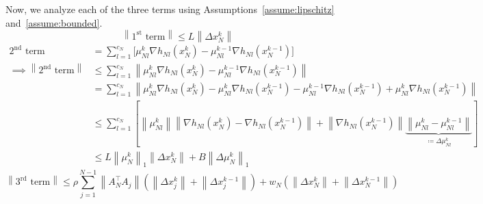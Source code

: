 \documentclass[11pt]{article}
\newcommand{\norm}[1]{\left\lVert #1 \right\rVert}
\begin{document}
Now, we analyze each of the three terms using Assumptions~\eqref{assume:lipschitz} and~\eqref{assume:bounded}.
\begin{equation*}
\norm{1^\text{st} \text{ term}} \leq L \norm{\Delta x_N^k}
\end{equation*}
\begin{align*}
2^\text{nd} \text{ term} &= \sum_{l = 1}^{c_N} \big[\mu_{Nl}^k\nabla h_{Nl}(x_N^k) - \mu_{Nl}^{k-1}\nabla h_{Nl}(x_N^{k-1}) \big] \\
\implies  \norm{2^\text{nd} \text{ term}} &\leq \sum_{l = 1}^{c_N} \norm{\mu_{Nl}^k\nabla h_{Nl}(x_N^k) - \mu_{Nl}^{k-1}\nabla h_{Nl}(x_N^{k-1})} \\
&= \sum_{l = 1}^{c_N} \norm{\mu_{Nl}^k\nabla h_{Nl}(x_N^k) - \mu_{Nl}^k\nabla h_{Nl}(x_N^{k-1}) - \mu_{Nl}^{k-1}\nabla h_{Nl}(x_N^{k-1}) + \mu_{Nl}^{k}\nabla h_{Nl}(x_N^{k-1})} \\
&\leq \sum_{l = 1}^{c_N} \left[\norm{\mu_{Nl}^k} \norm{\nabla h_{Nl}(x_N^k) - \nabla h_{Nl}(x_N^{k-1})} + \norm{\nabla h_{Nl}(x_N^{k-1})} \underset{\coloneqq\Delta \mu_{Nl}^k}{\underbrace{\norm{\mu_{Nl}^{k} - \mu_{Nl}^{k-1}}}}\right] \\
&\leq L \norm{\mu_{N}^k}_1 \norm{\Delta x_N^k} + B\norm{\Delta \mu_{N}^{k}}_1
\end{align*}
\begin{equation*}
\norm{3^\text{rd} \text{ term}} \leq \rho \sum_{j = 1}^{N-1} \norm{A_N^\top A_j} \left(\norm{\Delta x_j^k} + \norm{\Delta x_j^{k - 1}} \right) + w_N\left(\norm{\Delta x_N^k} + \norm{\Delta x_N^{k-1}}\right)
\end{equation*}
\end{document}
